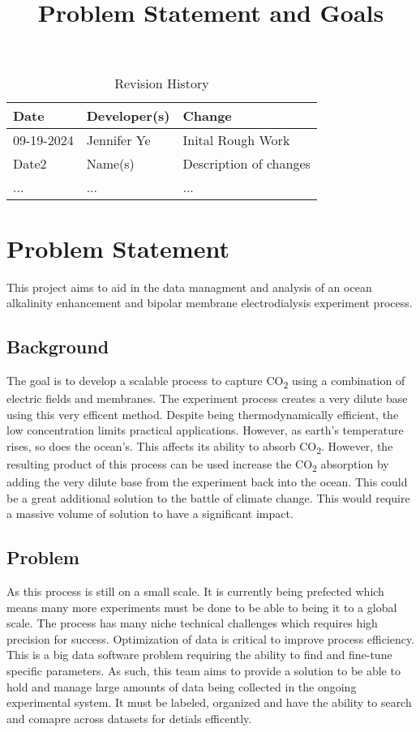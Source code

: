 \documentclass{article}
\title{Problem Statement and Goals\\\progname}
\author{\authname}
\date{}
\begin{document}
\maketitle

\begin{table}[hp]
\caption{Revision History} \label{TblRevisionHistory}
\begin{tabularx}{\textwidth}{llX}
\toprule
\textbf{Date} & \textbf{Developer(s)} & \textbf{Change}\\
\midrule
09-19-2024 & Jennifer Ye & Inital Rough Work \\
Date2 & Name(s) & Description of changes\\
... & ... & ...\\
\bottomrule
\end{tabularx}
\end{table}

\section{Problem Statement}
This project aims to aid in the data managment and analysis of an ocean alkalinity enhancement and bipolar membrane electrodialysis experiment process. 

\subsection{Background}
The goal is to develop a scalable process to capture CO\textsubscript{2} using a combination of electric fields and membranes.
The experiment process creates a very dilute base using this very efficent method. 
Despite being thermodynamically efficient, the low concentration limits practical applications. However, as earth's temperature rises, so does the ocean's. This affects its ability to 
absorb CO\textsubscript{2}. However, the resulting product of this process
can be used increase the CO\textsubscript{2} absorption by adding the very dilute base from the experiment back into the ocean. This could be a great additional solution to the battle of climate change. 
This would require a massive volume of solution to have a significant impact. 

\subsection{Problem}
As this process is still on a small scale. It is currently being prefected which means many more experiments must be done to be able to being it to a global scale. 
The process has many niche technical challenges which requires high precision for success.
Optimization of data is critical to improve process efficiency. This is a big data software problem requiring the ability to find and fine-tune specific parameters. 
\newline
As such, this team aims to provide a solution to be able to hold and manage large amounts of data being collected in the ongoing experimental system.
It must be labeled, organized and have the ability to search and comapre across datasets for detials efficently.
\newline
\end{document}
